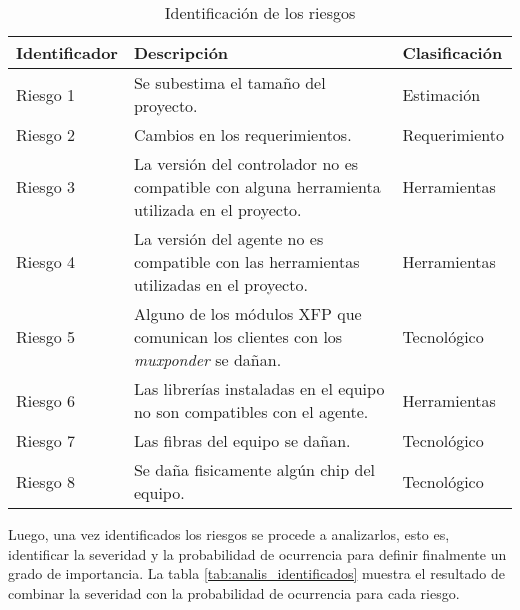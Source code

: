 \begin{table}[H]
  \centering
  \begin{tabular}{ |m{2.5cm}|m{7.5cm}|m{2.5cm}|  }
  
  \hline
  \centering
  \textbf{Identificador} & \textbf{Descripción} & \textbf{Clasificación} \\
  \hline
  \centering
  Riesgo 1 & Se subestima el tamaño del proyecto. & Estimación  \\
  \hline
  \centering
  Riesgo 2 & Cambios en los requerimientos. & Requerimiento  \\
  \hline
  \centering
  Riesgo 3 & La versión del controlador no es compatible con alguna herramienta utilizada en el proyecto. & Herramientas \\
  \hline
  \centering
  Riesgo 4 & La versión del agente no es compatible con las herramientas utilizadas en el proyecto. & Herramientas  \\
  \hline

  \centering
  Riesgo 5 & Alguno de los módulos XFP que comunican los clientes con los \textit{muxponder} se dañan.  & Tecnológico  \\
  \hline

  \centering
  Riesgo 6 & Las librerías instaladas en el equipo no son compatibles con el agente. & Herramientas  \\
  \hline

  \centering
  Riesgo 7 & Las fibras del equipo se dañan. & Tecnológico  \\
  \hline

  \centering
  Riesgo 8 & Se daña fisicamente algún chip del equipo. & Tecnológico  \\
  \hline
  
  \end{tabular}
  \caption{Identificación de los riesgos}
  \label{tab:riesgos_identificados}
  \end{table}

  Luego, una vez identificados los riesgos se procede a analizarlos, esto es, identificar la severidad y la probabilidad de ocurrencia para definir finalmente un grado de importancia. La tabla \ref{tab:analis_identificados} muestra el resultado de combinar la severidad con la probabilidad de ocurrencia para cada riesgo.

